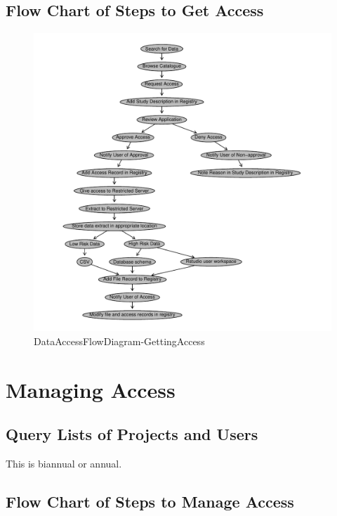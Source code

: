 \documentclass[a4paper]{article}
\begin{document}
\subsection{Flow Chart of Steps to Get Access}
\label{sec-3-1}

\begin{figure}[!h]
\centering
\includegraphics[width=\textwidth]{DataAccessFlowDiagram-GettingAccess.pdf}
\caption{DataAccessFlowDiagram-GettingAccess}
\label{fig:DataAccessFlowDiagram-GettingAccess}
\end{figure}
\clearpage
\section{Managing Access}
\label{sec-4}
\subsection{Query Lists of Projects and Users}
\label{sec-4-1}

This is biannual or annual.
\subsection{Flow Chart of Steps to Manage Access}
\label{sec-4-2}
\end{document}
